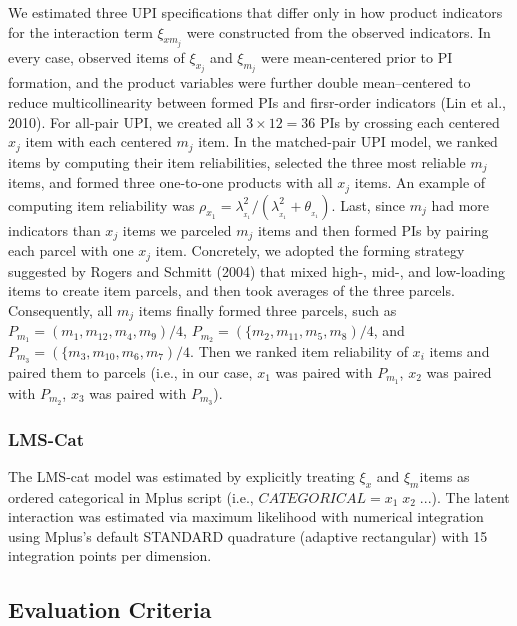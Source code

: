 \documentclass[
  man]{apa6}
\begin{document}
We estimated three UPI specifications that differ only in how product indicators for the interaction term \(\xi_{xm_{j}}\) were constructed from the observed indicators. In every case, observed items of \(\xi_{x_{j}}\) and \(\xi_{m_{j}}\) were mean-centered prior to PI formation, and the product variables were further double mean--centered to reduce multicollinearity between formed PIs and firsr-order indicators (Lin et al., 2010). For all-pair UPI, we created all \(3 \times 12 = 36\) PIs by crossing each centered \(x_{j}\) item with each centered \(m_{j}\) item. In the matched-pair UPI model, we ranked items by computing their item reliabilities, selected the three most reliable \(m_{j}\) items, and formed three one-to-one products with all \(x_{j}\) items. An example of computing item reliability was \(\rho_{x_{1}} = \lambda_{_{x_{1}}}^2/(\lambda_{_{x_{1}}}^2 + \theta_{_{x_{1}}})\). Last, since \(m_{j}\) had more indicators than \(x_{j}\) items we parceled \(m_{j}\) items and then formed PIs by pairing each parcel with one \(x_{j}\) item. Concretely, we adopted the forming strategy suggested by Rogers and Schmitt (2004) that mixed high-, mid-, and low-loading items to create item parcels, and then took averages of the three parcels. Consequently, all \(m_{j}\) items finally formed three parcels, such as \(P_{m_{1}} = (m_{1}, m_{12}, m_{4}, m_{9})/4\), \(P_{m_{2}} = (\{m_{2}, m_{11}, m_{5}, m_{8})/4\), and \(P_{m_{3}} = (\{m_{3}, m_{10}, m_{6}, m_{7})/4\). Then we ranked item reliability of \(x_{i}\) items and paired them to parcels (i.e., in our case, \(x_{1}\) was paired with \(P_{m_{1}}\), \(x_{2}\) was paired with \(P_{m_{2}}\), \(x_{3}\) was paired with \(P_{m_{3}}\)).

\subsubsection{LMS-Cat}\label{lms-cat}

The LMS-cat model was estimated by explicitly treating \(\xi_{x}\) and \(\xi_{m}\)items as ordered categorical in Mplus script (i.e., \(CATEGORICAL = x_{1} \; x_{2} \; ...\)). The latent interaction was estimated via maximum likelihood with numerical integration using Mplus's default STANDARD quadrature (adaptive rectangular) with 15 integration points per dimension.

\subsection{Evaluation Criteria}\label{evaluation-criteria}
\end{document}
